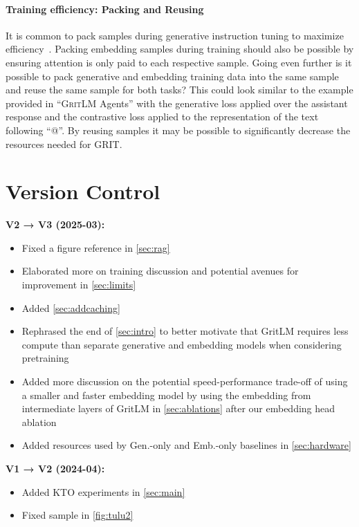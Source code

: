 \documentclass{article}
\newcommand{\model}{\textsc{GritLM}}
\newcommand{\method}{\textsc{GRIT}}
\begin{document}
\paragraph{Training efficiency: Packing and Reusing} It is common to pack samples during generative instruction tuning to maximize efficiency~\citep{chung2022scaling,muennighoff2023crosslingual}. Packing embedding samples during training should also be possible by ensuring attention is only paid to each respective sample. Going even further is it possible to pack generative and embedding training data into the same sample and reuse the same sample for both tasks? This could look similar to the example provided in ``\model{} Agents'' with the generative loss applied over the assistant response and the contrastive loss applied to the representation of the text following ``@''. By reusing samples it may be possible to significantly decrease the resources needed for \method{}.

\section{Version Control}
\label{sec:vc}

\textbf{V2 → V3 (2025-03):}
\begin{itemize}
\item Fixed a figure reference in \autoref{sec:rag}
\item Elaborated more on training discussion and potential avenues for improvement in \autoref{sec:limits}
\item Added \autoref{sec:addcaching}
\item Rephrased the end of \autoref{sec:intro} to better motivate that GritLM requires less compute than separate generative and embedding models when considering pretraining
\item Added more discussion on the potential speed-performance trade-off of using a smaller and faster embedding model by using the embedding from intermediate layers of GritLM in \autoref{sec:ablations} after our embedding head ablation
\item Added resources used by Gen.-only and Emb.-only baselines in \autoref{sec:hardware}
\end{itemize}

\textbf{V1 → V2 (2024-04):}
\begin{itemize}
\item Added KTO experiments in \autoref{sec:main}
\item Fixed sample in \autoref{fig:tulu2}
\end{itemize}
\end{document}
